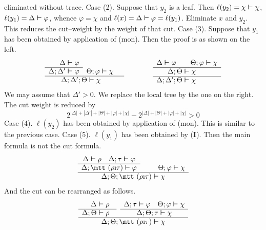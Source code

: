 eliminated without trace. Case (2). Suppose that $y_2$ is a leaf.
Then $\ell(y_2) = \chi \boldsymbol{\vdash} \chi$, $\ell(y_1) = \Delta \boldsymbol{\vdash}
\varphi$, whence $\varphi  = \chi$ and $\ell(x) = \Delta \boldsymbol{\vdash}
\varphi = \ell(y_1)$. Eliminate $x$ and $y_2$. This reduces the
cut--weight by the weight of that cut. Case (3). Suppose that
$y_1$ has been obtained by application of (mon). Then the proof is
as shown on the left.
\begin{equation}
\begin{array}{r@{\;\bvdash\;}rcc}
\Delta & \varphi & \quad & \\\cline{1-2}
\Delta;\Delta' & \varphi & \Theta;\varphi \bvdash \chi \\\hline
\multicolumn{3}{c}{\Delta;\Delta';\Theta \bvdash \chi}
\end{array}
\qquad
\qquad
\begin{array}{r@{\;\bvdash\;}l}
\multicolumn{2}{c}{\Delta \bvdash \varphi \qquad
    \Theta;\varphi \bvdash \chi } \\\hline
\Delta;\Theta & \chi \\\hline
\Delta;\Delta';\Theta & \chi
\end{array}
\end{equation}
We may assume that $\Delta' > 0$. We replace the local tree by the 
one on the right. The cut weight is reduced by 
\begin{equation}
2^{|\Delta| + |\Delta'| + |\Theta| + |\varphi| + |\chi|}  
- 2^{|\Delta| + |\Theta| + |\varphi| + |\chi|} > 0  
\end{equation}
Case (4). $\ell(y_2)$ has been obtained by application of (mon). This 
is similar to the previous case. Case (5). $\ell(y_1)$ has been obtained 
by ({\mtt{}}\textbf{I}). Then the main formula is not the cut 
formula.
\begin{equation}
\begin{array}{ccc}
\Delta \bvdash \rho \quad \Delta;\tau \bvdash \varphi & \quad &
    \\\cline{1-1}
\Delta;\mbox{\mtt ($\rho$\symbol{25}$\tau$)} \bvdash \varphi & &
    \Theta;\varphi \bvdash \chi \\\hline
\multicolumn{3}{c}{\Delta;\Theta;\mbox{\mtt ($\rho$\symbol{25}$\tau$)}
    \bvdash \chi}
\end{array}
\end{equation}
And the cut can be rearranged as follows.
\begin{equation}
\begin{array}{r@{\;\bvdash\;}l@{\quad}ccc}
\Delta & \rho & & \Delta;\tau \bvdash \varphi &
    \Theta;\varphi \bvdash \chi \\\cline{1-2}\cline{4-5}
\Delta;\Theta & \rho & &
    \multicolumn{2}{c}{\Delta;\Theta;\tau \bvdash \chi}
\\\hline
\multicolumn{5}{c}{\Delta;\Theta;\mbox{\mtt ($\rho$\symbol{25}$\tau$)}
    \bvdash \chi}
\end{array}
\end{equation}
